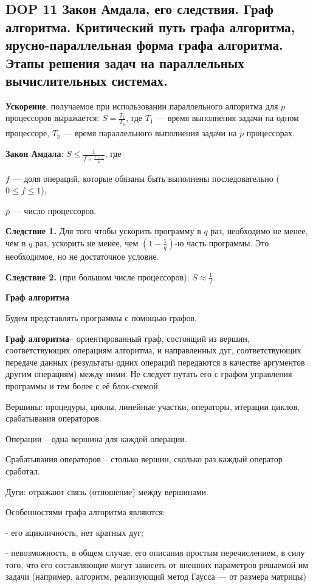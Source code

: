 \subsection{DOP 11 Закон Амдала, его следствия. Граф алгоритма. Критический путь графа алгоритма, ярусно-параллельная форма графа алгоритма. Этапы решения задач на параллельных вычислительных системах.}


\textbf{Ускорение}, получаемое при использовании параллельного алгоритма для $p$ процессоров выражается: $S = \frac{T_1}{T_p}$, где $T_1$ --- время выполнения задачи на одном процессоре, $T_p$ --- время параллельного выполнения задачи на $p$ процессорах.

\textbf{Закон Амдала}:
$S \leqslant \frac{1}{f + \frac{1 - f}{p}}$, где

$f$ --- доля операций, которые обязаны быть выполнены последовательно ($0 \leqslant f \leqslant 1$),

$p$ --- число процессоров.

\textbf{Следствие 1.}
Для того чтобы ускорить программу в $q$ раз, необходимо не менее, чем в $q$ раз, ускорить не менее, чем $\left(1 - \frac{1}{q}\right)$-ю часть программы. Это необходимое, но не достаточное условие.

\textbf{Следствие 2.} (при большом числе процессоров):
$S \approx \frac{1}{f}$.

\textbf{Граф алгоритма}

Будем представлять программы с помощью графов.

\textbf{Граф алгоритма}-- ориентированный граф, состоящий из вершин, соответствующих операциям алгоритма, и направленных дуг, соответствующих передаче данных (результаты одних операций передаются в качестве аргументов другим операциям) между ними. Не следует путать его с графом управления программы и тем более с её блок-схемой.

Вершины: процедуры, циклы, линейные участки, операторы, итерации циклов, срабатывания операторов.

Операции -- одна вершина для каждой операции.

Срабатывания операторов -- столько вершин, сколько раз каждый оператор сработал.

Дуги: отражают связь (отношение) между вершинами.

Особенностями графа алгоритма являются:

 - его ацикличность, нет кратных дуг;

 - невозможность, в общем случае, его описания простым перечислением, в силу того, что его составляющие могут зависеть от внешних параметров решаемой им задачи (например, алгоритм, реализующий метод Гаусса — от размера матрицы)

